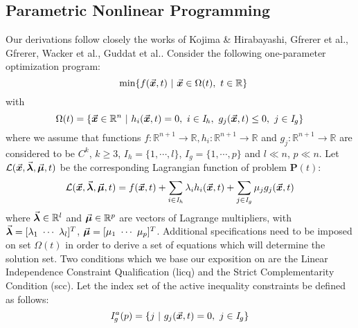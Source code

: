 \subsection{Parametric Nonlinear Programming}\label{CH4-S1SS3}

Our derivations follow
closely the works of Kojima \& Hirabayashi\cite{Kojima:1984}, Gfrerer et
al.\cite{Gfrerer:1983}, Gfrerer, Wacker et al.\cite{Gfrerer:1985}, Guddat et
al.\cite{Guddat:1990}.
Consider the following one-parameter optimization program:
\begin{equation}
	\hspace*{-4.5cm}\textbf{P}(t): \hspace*{3.8cm}\text{min}\{f(\bvec{x},t)\ |\
	\bvec{x}\in\Omega(t),\
	t\in\mathbb{R}\}
	\label{eq:PNLP}
\end{equation}
\noindent with
\begin{equation}
	\Omega(t)=\{\bvec{x}\in\mathbb{R}^n\ |\ h_i(\bvec{x},t)=0,\ 
	i\in\mathit{I}_h,\
	g_j(\bvec{x},t)\leq 0,\ j\in\mathit{I}_g\}
	\label{eq:ConstraintSet}
\end{equation}
\noindent where we assume that functions
$f:\mathbb{R}^{n+1}\rightarrow\mathbb{R},h_i:\mathbb{R}^{n+1}\rightarrow\mathbb{R}$
and $g_j:\mathbb{R}^{n+1}\rightarrow\mathbb{R}$  are considered to
be $C^k$, $k\geq 3$, $\mathit{I}_h=\{1,\cdots,l\}$,
$\mathit{I}_g=\{1,\cdots,p\}$ and $l\ll n$, $p\ll n$. Let
$\mathcal{L}(\vec{\bm{x}},\vec{\bm{\lambda}},\vec{\bm{\mu}},t)$ be the corresponding 
Lagrangian 
function of
problem \textbf{P}$(t)$:
\begin{equation}
	\mathcal{L}(\vec{\bm{x}},\vec{\bm{\lambda}},\vec{\bm{\mu}},t) =
	f(\vec{\bm{x}},t)+\sum_{i\in\mathit{I}_h}\lambda_ih_i(\vec{\bm{x}},t)+\sum_{j\in\mathit{I}_g}
	\mu_jg_j(\vec{\bm{x}},t)
	\label{eq:Lagrangian}
\end{equation}
\noindent where $\vec{\bm{\lambda}}\in\mathbb{R}^l$ and $\vec{\bm{\mu}}\in\mathbb{R}^p$ 
are vectors of
Lagrange multipliers, with $\bvec{\lambda}=	[\lambda_1 \ \cdots \ 
\lambda_l]^T$, 
$\bvec{\mu}=[\mu_1 \ \cdots \ \mu_p]^T$. 
Additional specifications need to be imposed on set $\Omega(t)$ in order to
derive a set of equations which will determine the solution set. Two 
conditions which we base our exposition on are the Linear Independence
Constraint Qualification (\acrshort{licq}) and the Strict Complementarity 
Condition (\acrshort{scc}). Let the index set of the active inequality 
constraints be defined as follows:
\begin{equation}
	\mathit{I}_g^a(p)=\{j\ |\ g_j(\bvec{x},t)=0,\ j\in\mathit{I}_g\}
	\label{eq:activeindex}
\end{equation}

